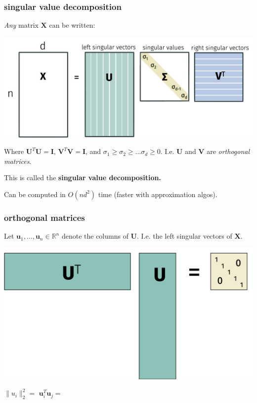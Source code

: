 \documentclass[handout,compress]{beamer}
\newcommand{\bv}[1]{\mathbf{#1}}
\newcommand{\R}{\mathbb{R}}
\begin{document}
\begin{frame}
	\frametitle{singular value decomposition}
	\small
	\emph{Any} matrix $\bv{X}$ can be written:
	\begin{center}
		\includegraphics[width=.9\textwidth]{svd.png}
	\end{center} 
	Where $\bv{U}^T\bv{U} = \bv{I}$,  $\bv{V}^T\bv{V} = \bv{I}$, and $\sigma_1 \geq \sigma_2 \geq \ldots \sigma_d \geq 0$. I.e. $\bv{U}$ and $\bv{V}$ are \emph{orthogonal matrices}.
	\begin{center}
		\normalsize This is called the \textbf{singular value decomposition.}
	\end{center}
Can be computed in $O(nd^2)$ time (faster with approximation algos).
\end{frame}

\begin{frame}
	\frametitle{orthogonal matrices}
	Let $\bv{u}_1, \ldots, \bv{u}_n \in \R^n$ denote the columns of $\bv{U}$. I.e. the left singular vectors of $\bv{X}$. 
		\begin{center}
		\includegraphics[width=.5\textwidth]{orthogonal.png}
	\end{center}
\begin{center}
	$\|u_i\|_2^2 = $ \hspace{8em} $\bv{u}_i^T\bv{u}_j = $
\end{center}
	
\end{frame}
\end{document}
